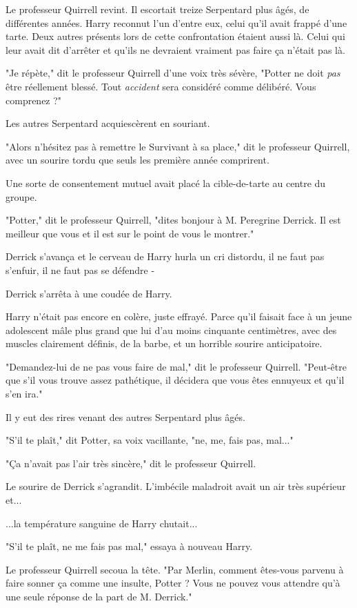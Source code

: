 Le professeur Quirrell revint. Il escortait treize Serpentard plus âgés, de différentes années. Harry reconnut l'un d'entre eux, celui qu'il avait frappé d'une tarte. Deux autres présents lors de cette confrontation étaient aussi là. Celui qui leur avait dit d'arrêter et qu'ils ne devraient vraiment pas faire ça n'était pas là.

"Je répète," dit le professeur Quirrell d'une voix très sévère, "Potter ne doit \emph{pas}  être réellement blessé. Tout \emph{accident}  sera considéré comme délibéré. Vous comprenez ?"

Les autres Serpentard acquiescèrent en souriant.

"Alors n'hésitez pas à remettre le Survivant à sa place," dit le professeur Quirrell, avec un sourire tordu que seuls les première année comprirent.

Une sorte de consentement mutuel avait placé la cible-de-tarte au centre du groupe.

"Potter," dit le professeur Quirrell, "dites bonjour à M. Peregrine Derrick. Il est meilleur que vous et il est sur le point de vous le montrer."

Derrick s'avança et le cerveau de Harry hurla un cri distordu, il ne faut pas s'enfuir, il ne faut pas se défendre -

Derrick s'arrêta à une coudée de Harry.

Harry n'était pas encore en colère, juste effrayé. Parce qu'il faisait face à un jeune adolescent mâle plus grand que lui d'au moins cinquante centimètres, avec des muscles clairement définis, de la barbe, et un horrible sourire anticipatoire.

"Demandez-lui de ne pas vous faire de mal," dit le professeur Quirrell. "Peut-être que s'il vous trouve assez pathétique, il décidera que vous êtes ennuyeux et qu'il s'en ira."

Il y eut des rires venant des autres Serpentard plus âgés.

"S'il te plaît," dit Potter, sa voix vacillante, "ne, me, fais pas, mal..."

"Ça n'avait pas l'air très sincère," dit le professeur Quirrell.

Le sourire de Derrick s'agrandit. L'imbécile maladroit avait un air très supérieur et...

...la température sanguine de Harry chutait...

"S'il te plaît, ne me fais pas mal," essaya à nouveau Harry.

Le professeur Quirrell secoua la tête. "Par Merlin, comment êtes-vous parvenu à faire sonner ça comme une insulte, Potter ? Vous ne pouvez vous attendre qu'à une seule réponse de la part de M. Derrick."

